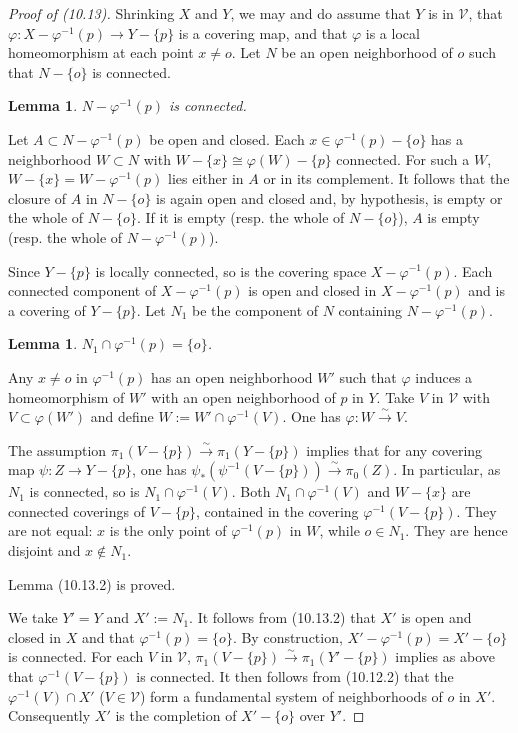 \documentclass[12pt,a4paper]{article}
\theoremstyle{plain}
\newtheorem{lemma}[theorem]{Lemma}
\theoremstyle{definition}
\theoremstyle{remark}
\begin{document}
\begin{proof}[Proof of (10.13)]
Shrinking $X$ and $Y$, we may and do assume that $Y$ is in $\mathscr{V}$, that $\varphi : X - \varphi^{-1}(p) \to Y - \{p\}$ is a covering map, and that $\varphi$ is a local homeomorphism at each point $x \neq o$. Let $N$ be an open neighborhood of $o$ such that $N - \{o\}$ is connected.

\begin{lemma}
\label{10.13.1}
$N - \varphi^{-1}(p)$ is connected.
\end{lemma}

Let $A \subset N - \varphi^{-1}(p)$ be open and closed. Each $x \in \varphi^{-1}(p) - \{o\}$ has a neighborhood $W \subset N$ with $W - \{x\} \cong \varphi(W) - \{p\}$ connected. For such a $W$, $W - \{x\} = W - \varphi^{-1}(p)$ lies either in $A$ or in its complement. It follows that the closure of $A$ in $N - \{o\}$ is again open and closed and, by hypothesis, is empty or the whole of $N - \{o\}$. If it is empty (resp. the whole of $N - \{o\}$), $A$ is empty (resp. the whole of $N - \varphi^{-1}(p)$).

Since $Y - \{p\}$ is locally connected, so is the covering space $X - \varphi^{-1}(p)$. Each connected component of $X - \varphi^{-1}(p)$ is open and closed in $X - \varphi^{-1}(p)$ and is a covering of $Y - \{p\}$. Let $N_1$ be the component of $N$ containing $N - \varphi^{-1}(p)$.

\begin{lemma}
\label{10.13.2}
$N_1 \cap \varphi^{-1}(p) = \{o\}$.
\end{lemma}

Any $x \neq o$ in $\varphi^{-1}(p)$ has an open neighborhood $W'$ such that $\varphi$ induces a homeomorphism of $W'$ with an open neighborhood of $p$ in $Y$. Take $V$ in $\mathscr{V}$ with $V \subset \varphi(W')$ and define $W := W' \cap \varphi^{-1}(V)$. One has $\varphi : W \xrightarrow{\sim} V$.

The assumption $\pi_1(V - \{p\}) \xrightarrow{\sim} \pi_1(Y - \{p\})$ implies that for any covering map $\psi : Z \to Y - \{p\}$, one has $\psi_*(\psi^{-1}(V - \{p\})) \xrightarrow{\sim} \pi_0(Z)$. In particular, as $N_1$ is connected, so is $N_1 \cap \varphi^{-1}(V)$. Both $N_1 \cap \varphi^{-1}(V)$ and $W - \{x\}$ are connected coverings of $V - \{p\}$, contained in the covering $\varphi^{-1}(V - \{p\})$. They are not equal: $x$ is the only point of $\varphi^{-1}(p)$ in $W$, while $o \in N_1$. They are hence disjoint and $x \notin N_1$.

Lemma (10.13.2) is proved.

We take $Y' = Y$ and $X' := N_1$. It follows from (10.13.2) that $X'$ is open and closed in $X$ and that $\varphi^{-1}(p) = \{o\}$. By construction, $X' - \varphi^{-1}(p) = X' - \{o\}$ is connected. For each $V$ in $\mathscr{V}$, $\pi_1(V - \{p\}) \xrightarrow{\sim} \pi_1(Y' - \{p\})$ implies as above that $\varphi^{-1}(V - \{p\})$ is connected. It then follows from (10.12.2) that the $\varphi^{-1}(V) \cap X'$ ($V \in \mathscr{V}$) form a fundamental system of neighborhoods of $o$ in $X'$. Consequently $X'$ is the completion of $X' - \{o\}$ over $Y'$.
\end{proof}
\end{document}
